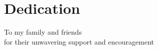 
\chapter*{Dedication}
\thispagestyle{plain}


To my family and friends\\
for their unwavering support and encouragement

